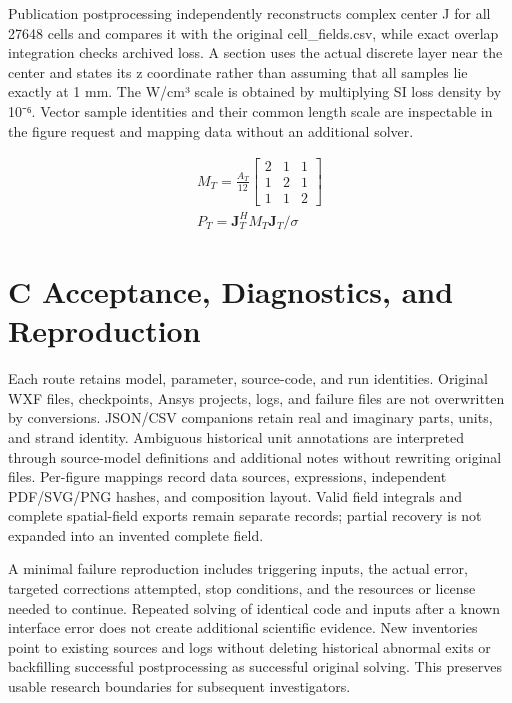\documentclass[journal,10pt]{IEEEtran}
\begin{document}
Publication postprocessing independently reconstructs complex center J for all 27648 cells and compares it with the original cell\_fields.csv, while exact overlap integration checks archived loss. A section uses the actual discrete layer near the center and states its z coordinate rather than assuming that all samples lie exactly at 1 mm. The W/cm³ scale is obtained by multiplying SI loss density by 10⁻⁶. Vector sample identities and their common length scale are inspectable in the figure request and mapping data without an additional solver.


\hypertarget{E09}{}
\begin{equation}
\begin{gathered}
M_T=\frac{A_T}{12}\begin{bmatrix}2&1&1\\1&2&1\\1&1&2\end{bmatrix} \\
P_T=\mathbf J_T^H M_T\mathbf J_T/\sigma
\end{gathered}
\tag{9}\label{eq:E09}
\end{equation}
\FloatBarrier
\section*{C Acceptance, Diagnostics, and Reproduction}
\hypertarget{chapter-C}{}
Each route retains model, parameter, source-code, and run identities. Original WXF files, checkpoints, Ansys projects, logs, and failure files are not overwritten by conversions. JSON/CSV companions retain real and imaginary parts, units, and strand identity. Ambiguous historical unit annotations are interpreted through source-model definitions and additional notes without rewriting original files. Per-figure mappings record data sources, expressions, independent PDF/SVG/PNG hashes, and composition layout. Valid field integrals and complete spatial-field exports remain separate records; partial recovery is not expanded into an invented complete field.


A minimal failure reproduction includes triggering inputs, the actual error, targeted corrections attempted, stop conditions, and the resources or license needed to continue. Repeated solving of identical code and inputs after a known interface error does not create additional scientific evidence. New inventories point to existing sources and logs without deleting historical abnormal exits or backfilling successful postprocessing as successful original solving. This preserves usable research boundaries for subsequent investigators.
\end{document}
